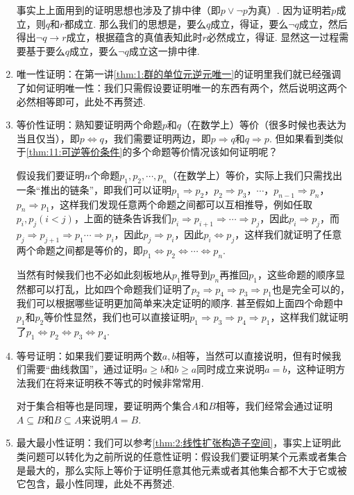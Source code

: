 \begin{enumerate}
    事实上上面用到的证明思想也涉及了排中律（即$p\lor\lnot p$为真）. 因为证明若$p$成立，则$q$和$r$都成立. 那么我们的思想是，要么$q$成立，得证，要么$\lnot q$成立，然后得出$\lnot q\to r$成立，根据蕴含的真值表知此时$r$必然成立，得证. 显然这一过程需要基于要么$q$成立，要么$\lnot q$成立这一排中律.

    \item 唯一性证明：在第一讲\autoref{thm:1:群的单位元逆元唯一}的证明里我们就已经强调了如何证明唯一性：我们只需假设要证明唯一的东西有两个，然后说明这两个必然相等即可，此处不再赘述.

    \item 等价性证明：熟知要证明两个命题$p$和$q$（在数学上）等价（很多时候也表达为当且仅当），即$p\iff q$，我们需要证明两边，即$p\Rightarrow q$和$q\Rightarrow p$. 但如果看到类似于\autoref{thm:11:可逆等价条件}的多个命题等价情况该如何证明呢？

    假设我们要证明$n$个命题$p_1,p_2,\cdots,p_n$（在数学上）等价，实际上我们只需找出一条``推出的链条''，即我们可以证明$p_1\Rightarrow p_2$，$p_2\Rightarrow p_3$，$\cdots$，$p_{n-1}\Rightarrow p_n$，$p_n\Rightarrow p_1$，这样我们发现任意两个命题之间都可以互相推导，例如任取$p_i, p_j(i<j)$，上面的链条告诉我们$p_i\Rightarrow p_{i+1}\Rightarrow\cdots\Rightarrow p_j$，因此$p_i\Rightarrow p_j$，而$p_j\Rightarrow p_{j+1}\Rightarrow p_1\cdots\Rightarrow p_i$，因此$p_j\Rightarrow p_i$，因此$p_i\iff p_j$，这样我们就证明了任意两个命题之间都是等价的，即$p_1\iff p_2\iff\cdots\iff p_n$.

    当然有时候我们也不必如此刻板地从$p_1$推导到$p_n$再推回$p_1$，这些命题的顺序显然都可以打乱，比如四个命题我们证明了$p_2\Rightarrow p_4\Rightarrow p_3\Rightarrow p_1$也是完全可以的，我们可以根据哪些证明更加简单来决定证明的顺序. 甚至假如上面四个命题中$p_1$和$p_2$等价性显然，我们也可以直接证明$p_1\Rightarrow p_3\Rightarrow p_4\Rightarrow p_1$，这样我们就证明了$p_1\iff p_2\iff p_3\iff p_4$.

    \item 等号证明：如果我们要证明两个数$a,b$相等，当然可以直接说明，但有时候我们需要``曲线救国''，通过证明$a\geqslant b$和$b\geqslant a$同时成立来说明$a=b$，这种证明方法我们在将来证明秩不等式的时候非常常用.

    对于集合相等也是同理，要证明两个集合$A$和$B$相等，我们经常会通过证明$A\subseteq B$和$B\subseteq A$来说明$A=B$.

    \item 最大最小性证明：我们可以参考\autoref{thm:2:线性扩张构造子空间}，事实上证明此类问题可以转化为之前所说的任意性证明：假设我们要证明某个元素或者集合是最大的，那么实际上等价于证明任意其他元素或者其他集合都不大于它或被它包含，最小性同理，此处不再赘述.
\end{enumerate}

